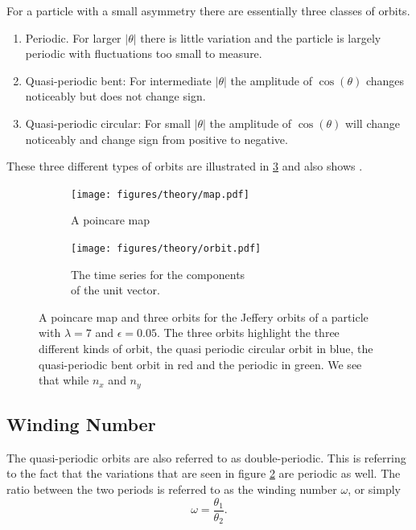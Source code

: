 For a particle with a small asymmetry there are essentially three classes of orbits.

\begin{enumerate}
\item Periodic. For larger $\left|\theta\right|$ there is little variation and the particle is largely periodic with fluctuations too small to measure.
\item Quasi-periodic bent: For intermediate $\left|\theta\right|$ the amplitude of $\cos(\theta)$ changes noticeably but does not change sign.
\item Quasi-periodic circular: For small $\left|\theta\right|$ the amplitude of $\cos(\theta)$ will change noticeably and change sign from positive to negative.
\end{enumerate}

These three different types of orbits are illustrated in \ref{fig:orbittypes} and also shows .

\begin{figure}[H]
\centering
\begin{subfigure}[3a]{0.40\textwidth}
\texttt{[image: figures/theory/map.pdf]}
\caption{A poincare map}\label{fig:orbitmap}
\end{subfigure}\hspace{1em}%
\begin{subfigure}[3b]{0.40\textwidth}
\texttt{[image: figures/theory/orbit.pdf]}
\caption{The time series for the components \\ of the unit vector.}\label{fig:orbitparams}
\end{subfigure}
\caption{A poincare map and three orbits for the Jeffery orbits of a particle with $\lambda=7$ and $\epsilon=0.05$. The three orbits highlight the three different kinds of orbit, the quasi periodic circular orbit in blue, the quasi-periodic bent orbit in red and the periodic in green. We see that while $n_x$ and $n_y$}
\label{fig:orbittypes}
\end{figure}

\subsection{Winding Number}
The quasi-periodic orbits are also referred to as double-periodic. This is referring to the fact that the variations that are seen in figure \ref{fig:orbitparams} are periodic as well. The ratio between the two periods is referred to as the winding number $\omega$, or simply
\begin{equation}\label{eq:winding}
\omega = \frac{\theta_1}{\theta_2}.
\end{equation}

